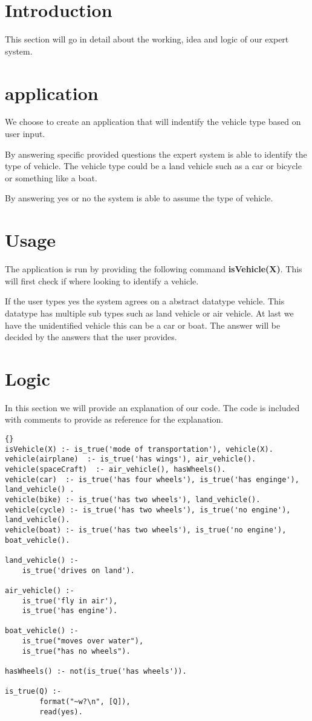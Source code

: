 \section{Introduction} \label{man-introduction}
This section will go in detail about the working, idea and logic of our expert system.

\section{application} \label{man-application}
We choose to create an application that will indentify the vehicle type based on user input.

By answering specific provided questions the expert system is able to identify the type of vehicle.
The vehicle type could be a land vehicle such as a car or bicycle or something like a boat.

By answering yes or no the system is able to assume the type of vehicle.


\section{Usage} \label{man-usage}
The application is run by providing the following command \textbf{isVehicle(X)}.
This will first check if where looking to identify a vehicle.

If the user types yes the system agrees on a abstract datatype vehicle.
This datatype has multiple sub types such as land vehicle or air vehicle. At last we have the unidentified
vehicle this can be a car or boat.
The answer will be decided by the answers that the user provides.

\newpage
\section{Logic} \label{man-logic}
In this section we will provide an explanation of our code.
The code is included with comments to provide as reference for the explanation.




\begin{lstlisting}{}
isVehicle(X) :- is_true('mode of transportation'), vehicle(X).
vehicle(airplane)  :- is_true('has wings'), air_vehicle().
vehicle(spaceCraft)  :- air_vehicle(), hasWheels().
vehicle(car)  :- is_true('has four wheels'), is_true('has enginge'), land_vehicle() .
vehicle(bike) :- is_true('has two wheels'), land_vehicle().
vehicle(cycle) :- is_true('has two wheels'), is_true('no engine'), land_vehicle().
vehicle(boat) :- is_true('has two wheels'), is_true('no engine'), boat_vehicle().

land_vehicle() :-
	is_true('drives on land').

air_vehicle() :-
	is_true('fly in air'), 
	is_true('has engine').

boat_vehicle() :-
	is_true("moves over water"),
    is_true("has no wheels").

hasWheels() :- not(is_true('has wheels')).

is_true(Q) :-
        format("~w?\n", [Q]),
        read(yes).
\end{lstlisting}



